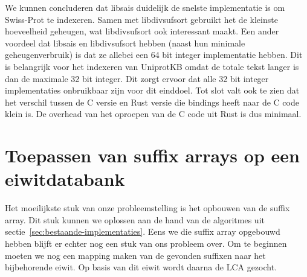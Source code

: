 We kunnen concluderen dat libsais duidelijk de snelste implementatie is om Swiss-Prot te indexeren.
Samen met libdivsufsort gebruikt het de kleinste hoeveelheid geheugen, wat libdivsufsort ook interessant maakt.
Een ander voordeel dat libsais en libdivsufsort hebben (naast hun minimale geheugenverbruik) is dat ze allebei een 64 bit integer implementatie hebben.
Dit is belangrijk voor het indexeren van UniprotKB omdat de totale tekst langer is dan de maximale 32 bit integer.
Dit zorgt ervoor dat alle 32 bit integer implementaties onbruikbaar zijn voor dit einddoel.
Tot slot valt ook te zien dat het verschil tussen de C versie en Rust versie die bindings heeft naar de C code klein is.
De overhead van het oproepen van de C code uit Rust is dus minimaal.

\section{Toepassen van suffix arrays op een eiwitdatabank}\label{sec:toepassen-van-suffix-arrays-op-een-eiwitdatabank}
Het moeilijkste stuk van onze probleemstelling is het opbouwen van de suffix array.
Dit stuk kunnen we oplossen aan de hand van de algoritmes uit sectie~\ref{sec:bestaande-implementaties}.
Eens we die suffix array opgebouwd hebben blijft er echter nog een stuk van ons probleem over.
Om te beginnen moeten we nog een mapping maken van de gevonden suffixen naar het bijbehorende eiwit.
Op basis van dit eiwit wordt daarna de LCA gezocht.

